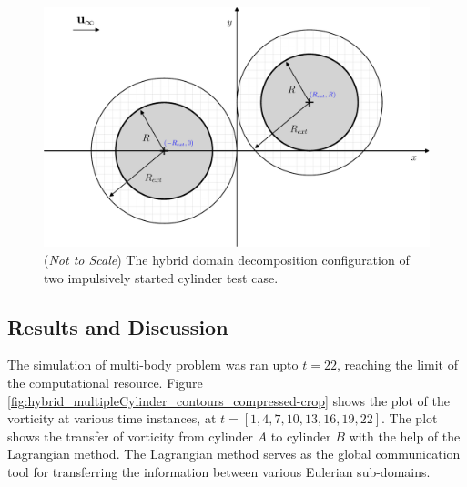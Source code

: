 	\begin{figure}[!h]
	\centering
	\includegraphics[width=0.6\linewidth]{./figures/validation/multipleCylinder/hmisc_dd-crop.pdf}
	\caption{(\textit{Not to Scale}) The hybrid domain decomposition configuration of two impulsively started cylinder test case. }
	\label{fig:hmisc_dd-crop}
	\end{figure}

\subsection{Results and Discussion}

The simulation of multi-body problem was ran upto $t=22$, reaching the limit of the computational resource. Figure \ref{fig:hybrid_multipleCylinder_contours_compressed-crop} shows the plot of the vorticity at various time instances, at $t=[1,4,7,10,13,16,19,22]$. The plot shows the transfer of vorticity from cylinder $A$ to cylinder $B$ with the help of the Lagrangian method. The Lagrangian method serves as the global communication tool for transferring the information between various Eulerian sub-domains. 

